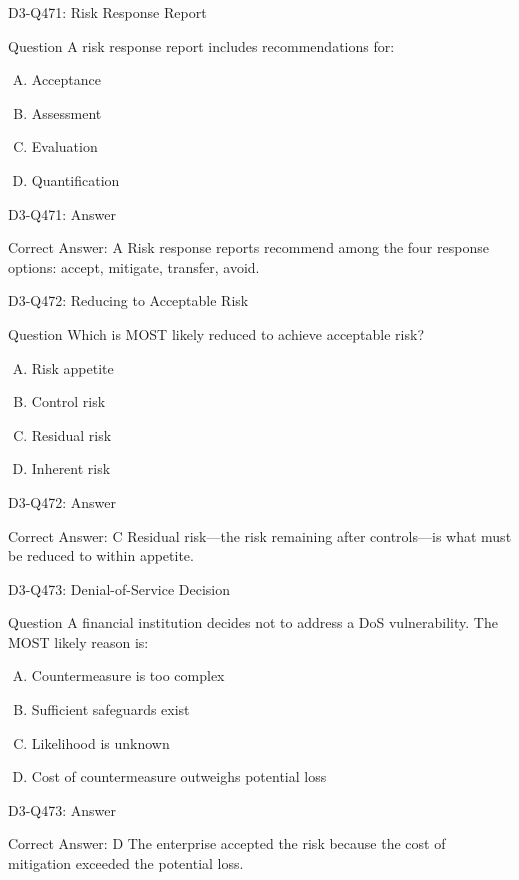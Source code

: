 \documentclass{beamer}
\begin{document}
\begin{frame}{D3-Q471: Risk Response Report}
	\begin{block}{Question}
		A risk response report includes recommendations for:
	\end{block}
	\begin{enumerate}[(A)]
		\item Acceptance
		\item Assessment
		\item Evaluation
		\item Quantification
	\end{enumerate}
\end{frame}
\begin{frame}{D3-Q471: Answer}
	\begin{block}{Correct Answer: A}
		Risk response reports recommend among the four response options: accept, mitigate, transfer, avoid.
	\end{block}
\end{frame}

\begin{frame}{D3-Q472: Reducing to Acceptable Risk}
	\begin{block}{Question}
		Which is MOST likely reduced to achieve acceptable risk?
	\end{block}
	\begin{enumerate}[(A)]
		\item Risk appetite
		\item Control risk
		\item Residual risk
		\item Inherent risk
	\end{enumerate}
\end{frame}
\begin{frame}{D3-Q472: Answer}
	\begin{block}{Correct Answer: C}
		Residual risk—the risk remaining after controls—is what must be reduced to within appetite.
	\end{block}
\end{frame}

\begin{frame}{D3-Q473: Denial-of-Service Decision}
	\begin{block}{Question}
		A financial institution decides not to address a DoS vulnerability. The MOST likely reason is:
	\end{block}
	\begin{enumerate}[(A)]
		\item Countermeasure is too complex
		\item Sufficient safeguards exist
		\item Likelihood is unknown
		\item Cost of countermeasure outweighs potential loss
	\end{enumerate}
\end{frame}
\begin{frame}{D3-Q473: Answer}
	\begin{block}{Correct Answer: D}
		The enterprise accepted the risk because the cost of mitigation exceeded the potential loss.
	\end{block}
\end{frame}
\end{document}
